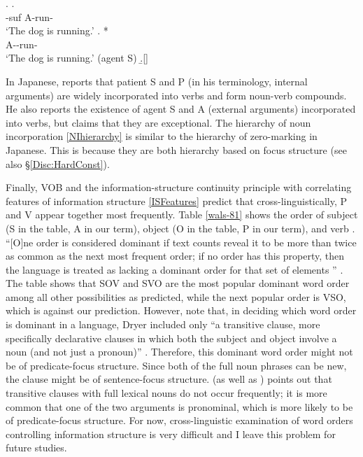 	\ex. \ag.   \\
			-{\sc suf} {\sc A}-run- \\
			`The dog is running.'
		\bg. * \\
			{\sc A}--run- \\
			`The dog is running.'
			\hfill{(agent S)}
		\b.[] \hfill{\cite{allenetal84,baker88}}

In Japanese,
 reports that
patient S and P (in his terminology, internal arguments) are widely incorporated into verbs and form noun-verb compounds.
He also reports the existence of agent S and A (external arguments) incorporated into verbs,
but claims that they are exceptional.
The hierarchy of noun incorporation \ref{NIhierarchy} is similar to the hierarchy of zero-marking in Japanese.
This is because
they are both hierarchy based on focus structure (see also \S \ref{Disc:HardConst}).

Finally, VOB and the information-structure continuity principle with correlating features of information structure \ref{ISFeatures} predict that
cross-linguistically,
P and V appear together most frequently.
Table \ref{wals-81} shows the order of subject (S in the table, A in our term), object (O in the table, P in our term), and verb \cite{wals-81}.
``[O]ne order is considered dominant if text counts reveal it to be more than twice as common as the next most frequent order; if no order has this property, then the language is treated as lacking a dominant order for that set of elements '' \cite{wals-s6}.
The table shows that
SOV and SVO are the most popular dominant word order among all other possibilities as predicted,
while the next popular order is VSO,
which is against our prediction.
However, note that, in deciding which word order is dominant in a language,
Dryer included only
``a transitive clause, more specifically declarative clauses in which both the subject and object involve a noun (and not just a pronoun)'' \cite{wals-81}.
Therefore, this dominant word order might not be of predicate-focus structure.
Since both of the full noun phrases can be new,
the clause might be of sentence-focus structure.
 (as well as ) points out that
transitive clauses with full lexical nouns do not occur frequently;
it is more common that
one of the two arguments is pronominal,
which is more likely to be of predicate-focus structure.
For now,
cross-linguistic examination of word orders controlling information structure is very difficult
and I leave this problem for future studies.

